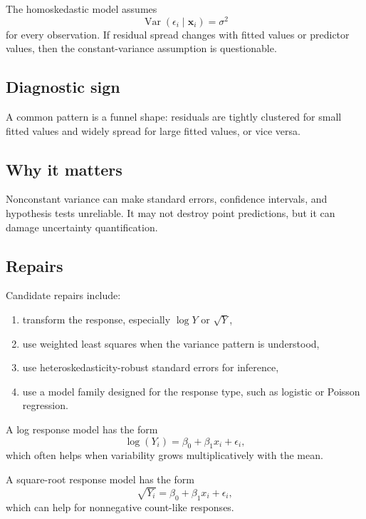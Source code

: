 The homoskedastic model assumes
\begin{equation}
  \operatorname{Var}(\epsilon_i\mid \mathbf{x}_i)=\sigma^2
\end{equation}
for every observation.  If residual spread changes with fitted values or predictor values, then the constant-variance assumption is questionable.

\subsection*{Diagnostic sign}

A common pattern is a funnel shape: residuals are tightly clustered for small fitted values and widely spread for large fitted values, or vice versa.

\subsection*{Why it matters}

Nonconstant variance can make standard errors, confidence intervals, and hypothesis tests unreliable.  It may not destroy point predictions, but it can damage uncertainty quantification.

\subsection*{Repairs}

Candidate repairs include:
\begin{enumerate}
  \item transform the response, especially \(\log Y\) or \(\sqrt{Y}\),
  \item use weighted least squares when the variance pattern is understood,
  \item use heteroskedasticity-robust standard errors for inference,
  \item use a model family designed for the response type, such as logistic or Poisson regression.
\end{enumerate}

A log response model has the form
\begin{equation}
  \log(Y_i)=\beta_0+\beta_1x_i+\epsilon_i,
\end{equation}
which often helps when variability grows multiplicatively with the mean.

A square-root response model has the form
\begin{equation}
  \sqrt{Y_i}=\beta_0+\beta_1x_i+\epsilon_i,
\end{equation}
which can help for nonnegative count-like responses.

